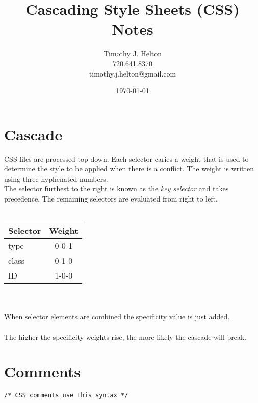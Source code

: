 \documentclass{article}
\newcommand{\mytitle}{Cascading Style Sheets (CSS) Notes}
\begin{document}
\author{Timothy J. Helton\\720.641.8370\\timothy.j.helton@gmail.com}
\date{\today}
\title{\mytitle}

\maketitle
\newpage

\tableofcontents
\newpage

\listoffigures
\listoftables
\newpage


\section{Cascade}
CSS files are processed top down. Each selector caries a weight that is used
to determine the style to be applied when there is a conflict. The weight is
written using three hyphenated numbers.\\
The selector furthest to the right is known as the \textit{key selector} and
takes precedence. The remaining selectors are evaluated from right to left.
\\
\\
\begin{tabular}{lc}
  \toprule
  Selector & Weight \\
  \midrule
    type & 0-0-1 \\
    class & 0-1-0 \\
    ID & 1-0-0 \\
  \bottomrule
\end{tabular}
\\
\\
When selector elements are combined the specificity value is just added.\\
\\
The higher the specificity weights rise, the more likely the cascade will break.

\section{Comments}

\begin{lstlisting}
/* CSS comments use this syntax */
\end{lstlisting}

\end{document}
